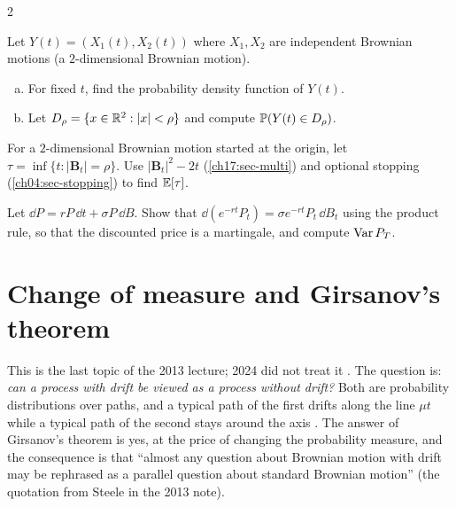\begin{paracol}{2}
\begin{exercise}\label{ch17:ex-b1}
Let $Y(t)=(X_1(t),X_2(t))$ where $X_1,X_2$ are independent Brownian motions (a $2$-dimensional Brownian motion).
\begin{enumerate}[(a)]
  \item For fixed $t$, find the probability density function of $Y(t)$.
  \item Let $D_\rho=\{x\in\mathbb{R}^2:|x|<\rho\}$ and compute $\mathbb{P}(Y(t)\in D_\rho)$.
\end{enumerate}
\end{exercise}

\begin{exercise}\label{ch17:ex-x4}
For a $2$-dimensional Brownian motion started at the origin, let $\tau=\inf\{t:|\bm B_t|=\rho\}$. Use $|\bm B_t|^2-2t$ (\cref{ch17:sec-multi}) and optional stopping (\cref{ch04:sec-stopping}) to find $\mathbb{E}[\tau]$.
\end{exercise}

\begin{exercise}\label{ch17:ex-x2}
Let $\dd P=rP\,\dd t+\sigma P\,\dd B$. Show that $\dd(e^{-rt}P_t)=\sigma e^{-rt}P_t\,\dd B_t$ using the product rule, so that the discounted price is a martingale, and compute $\operatorname{Var} P_T$.
\end{exercise}

\section{Change of measure and Girsanov's theorem}\label{ch17:sec-girsanov}

This is the last topic of the 2013 lecture; 2024 did not treat it . The question is: \emph{can a process with drift be viewed as a process without drift?} Both are probability distributions over paths, and a typical path of the
first drifts along the line $\mu t$ while a typical path of the second stays around the axis . The answer of Girsanov's theorem is yes, at the price of changing the probability measure, and the consequence
is that ``almost any question about Brownian motion with drift may be rephrased as a parallel question about standard Brownian motion'' (the quotation from Steele in the 2013 note).


\end{paracol}

